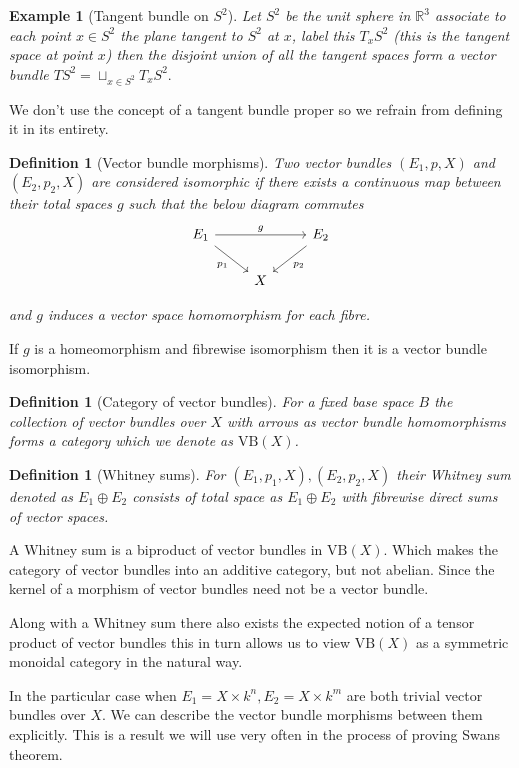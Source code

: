 \documentclass[12pt]{article}
\numberwithin{equation}{section}
\newcommand{\R}{\mathbb{R}}
\newcounter{dummy} \numberwithin{dummy}{section}
\newtheorem{definition}[dummy]{Definition}
\newtheorem{example}[dummy]{Example}
\begin{document}
	\begin{example}[Tangent bundle on $S^2$]
		Let $S^2$ be the unit sphere in $\R^3$ associate to each point $x \in S^2$ the plane tangent to $S^2$ at $x$, label this $T_xS^2$ (this is the tangent space at point $x$) then the disjoint union of all the tangent spaces form a vector bundle $T S^2 = \sqcup_{x \in S^2} T_x S^2.$ 
	\end{example}
	We don't use the concept of a tangent bundle proper so we refrain from defining it in its entirety.
	\begin{definition}[Vector bundle morphisms]
		Two vector bundles $(E_1,p, X)$ and $(E_2,p_2, X) $ are considered isomorphic if there exists a continuous map between their total spaces $g$ such that the below diagram commutes
		\[\begin{tikzcd}
			{E_1} && {E_2} \\
			& X
			\arrow["{p_1}"', from=1-1, to=2-2]
			\arrow["{p_2}", from=1-3, to=2-2]
			\arrow["g", from=1-1, to=1-3]
		\end{tikzcd}\]
		
		and $g$ induces a vector space homomorphism for each fibre.
	\end{definition}
	If $g$ is a homeomorphism and fibrewise isomorphism then it is a vector bundle isomorphism.
	
	\begin{definition}[Category of vector bundles]
		For a fixed base space $B$ the collection of vector bundles over $X$ with arrows as vector bundle homomorphisms forms a category which we denote as $\mathrm{VB}(X)$.
	\end{definition}
	\begin{definition}[Whitney sums]
		For $(E_1,p_1, X), (E_2,p_2,X)$ their Whitney sum denoted as $E_1 \oplus E_2$ consists of total space as $E_1 \oplus E_2$ with fibrewise direct sums of vector spaces.
	\end{definition}
	A Whitney sum is a biproduct of vector bundles in $\mathrm{VB}(X)$. Which makes the category of vector bundles into an additive category, but not abelian. Since the kernel of a morphism of vector bundles need not be a vector bundle. 
	
	Along with a Whitney sum there also exists the expected notion of a tensor product of vector bundles this in turn allows us to view $\mathrm{VB}(X)$ as a symmetric monoidal category in the natural way.
	
	In the particular case when $E_1=X \times k^n, E_2=X \times k^m$ are both trivial vector bundles over $X$. We can describe the vector bundle morphisms between them explicitly. This is a result we will use very often in the process of proving Swans theorem. 
	
\end{document}
